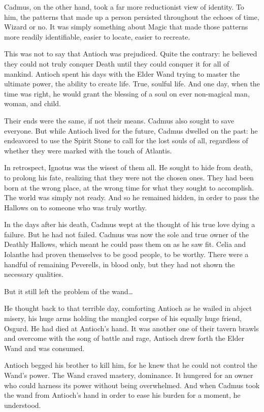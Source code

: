 Cadmus, on the other hand, took a far more reductionist view of identity. To him, the patterns that made up a person persisted throughout the echoes of time, Wizard or no. It was simply something about Magic that made those patterns more readily identifiable, easier to locate, easier to recreate.

This was not to say that Antioch was prejudiced. Quite the contrary: he believed they could not truly conquer Death until they could conquer it for all of mankind. Antioch spent his days with the Elder Wand trying to master the ultimate power, the ability to create life. True, soulful life. And one day, when the time was right, he would grant the blessing of a soul on ever non-magical man, woman, and child.

Their ends were the same, if not their means. Cadmus also sought to save everyone. But while Antioch lived for the future, Cadmus dwelled on the past: he endeavored to use the Spirit Stone to call for the lost souls of all, regardless of whether they were marked with the touch of Atlantis.

In retrospect, Ignotus was the wisest of them all. He sought to hide from death, to prolong his fate, realizing that they were not the chosen ones. They had been born at the wrong place, at the wrong time for what they sought to accomplish. The world was simply not ready. And so he remained hidden, in order to pass the Hallows on to someone who was truly worthy.

In the days after his death, Cadmus wept at the thought of his true love dying a failure. But he had not failed. Cadmus was now the sole and true owner of the Deathly Hallows, which meant he could pass them on as he saw fit. Celia and Iolanthe had proven themselves to be good people, to be worthy. There were a handful of remaining Peverells, in blood only, but they had not shown the necessary qualities.

But it still left the problem of the wand…

He thought back to that terrible day, comforting Antioch as he wailed in abject misery, his huge arms holding the mangled corpse of his equally huge friend, Osgurd. He had died at Antioch’s hand. It was another one of their tavern brawls and overcome with the song of battle and rage, Antioch drew forth the Elder Wand and was consumed.

Antioch begged his brother to kill him, for he knew that he could not control the Wand’s power. The Wand craved mastery, dominance. It hungered for an owner who could harness its power without being overwhelmed. And when Cadmus took the wand from Antioch’s hand in order to ease his burden for a moment, he understood.

